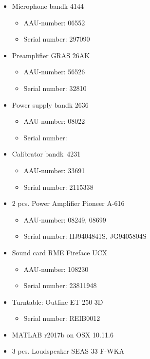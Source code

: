 \begin{itemize}[noitemsep]
\item Microphone \gls{bandk} 4144
\begin{itemize}[noitemsep]
\item AAU-number: 06552
\item Serial number: 297090
\end{itemize}
\item Preamplifier GRAS 26AK
\begin{itemize}[noitemsep]
\item AAU-number: 56526
\item Serial number: 32810
\end{itemize}
\item Power supply \gls{bandk} 2636
\begin{itemize}
\item AAU-number: 08022
\item Serial number: 
\end{itemize}
\item Calibrator \gls{bandk}\ 4231
\begin{itemize}[noitemsep]
\item AAU-number: 33691
\item Serial number: 2115338
\end{itemize}
\item 2 pcs. Power Amplifier Pioneer A-616
\begin{itemize}[noitemsep]
\item AAU-number: 08249, 08699
\item Serial number: HJ9404841S, JG9405804S
\end{itemize}
\item Sound card RME Fireface UCX
\begin{itemize}[noitemsep]
\item AAU-number: 108230
\item Serial number: 23811948
\end{itemize}
\item Turntable: Outline ET 250-3D
\begin{itemize}
\item Serial number: REIB0012
\end{itemize}
\item MATLAB r2017b on OSX 10.11.6
\item 3 pcs. Loudspeaker SEAS 33 F-WKA
\end{itemize}

